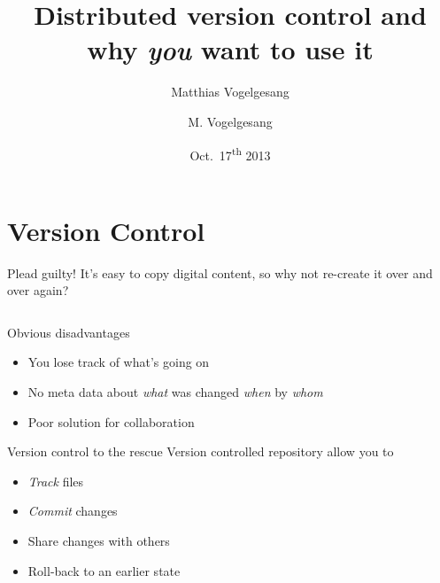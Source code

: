 \documentclass[18pt]{beamer}
\title{Distributed version control and why \emph{you} want to use it}
\author{M. Vogelgesang}
\subtitle{Matthias Vogelgesang}
\institute{Institute for Data Processing and Electronics}
\date{Oct.~17\textsuperscript{th} 2013}
\begin{document}
\maketitle

\section{Version Control}

\begin{frame}{Plead guilty!}
  It's easy to copy digital content, so why not re-create it over and over
  again?

  \begin{columns}[onlytextwidth]

  \end{columns}
\end{frame}
\begin{frame}{Obvious disadvantages}
  \begin{itemize}
    \item You lose track of what's going on
    \item No meta data about \emph{what} was changed \emph{when} by
      \emph{whom}
    \item Poor solution for collaboration
  \end{itemize}
\end{frame}
\begin{frame}{Version control to the rescue}
  Version controlled repository allow you to
  \begin{itemize}
    \item \emph{Track} files
    \item \emph{Commit} changes
    \item Share changes with others
    \item Roll-back to an earlier state
  \end{itemize}
\end{frame}
\end{document}
